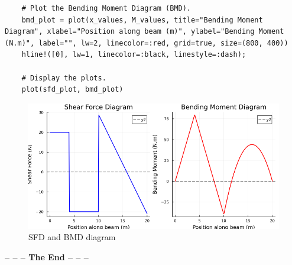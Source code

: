 \documentclass{homework}
\begin{document}
\begin{solution}
\begin{verbatim}
    # Plot the Bending Moment Diagram (BMD).
    bmd_plot = plot(x_values, M_values, title="Bending Moment Diagram", xlabel="Position along beam (m)", ylabel="Bending Moment (N.m)", label="", lw=2, linecolor=:red, grid=true, size=(800, 400))
    hline!([0], lw=1, linecolor=:black, linestyle=:dash);
    
    # Display the plots.
    plot(sfd_plot, bmd_plot)
    \end{verbatim}
    
    \begin{figure}[H]
        \centering
        \includegraphics[width=0.5\linewidth]{media/sbd-bmd-2.png}
        \caption{SFD and BMD diagram}
        \label{fig:this}
    \end{figure}
\end{solution}


% 
% 

\vspace{2cm}  %
\begin{center}
    \textbf{-- -- -- The End -- -- --}
\end{center}
\end{document}
